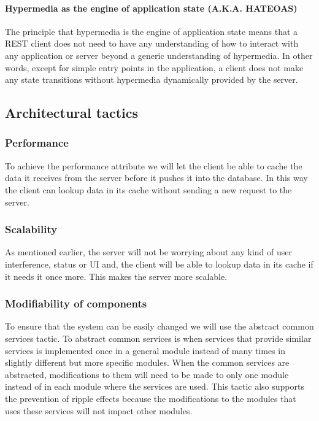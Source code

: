 \documentclass[../document.tex]{subfiles}
\begin{document}
\paragraph{Hypermedia as the engine of application state (A.K.A. HATEOAS)}
The principle that hypermedia is the engine of application state means that a REST client does not need to have any understanding of how to interact with any application or server beyond a generic understanding of hypermedia. In other words, except for simple entry points in the application, a client does not make any state transitions without hypermedia dynamically provided by the server. 

\subsection{Architectural tactics}
\subsubsection{Performance}
To achieve the performance attribute we will let the client be able to cache the data it receives from the server before it pushes it into the database. In this way the client can lookup data in its cache without sending a new request to the server.

\subsubsection{Scalability}
As mentioned earlier, the server will not be worrying about any kind of user interference, status or UI and, the client will be able to lookup data in its cache if it needs it once more. This makes the server more scalable.

\subsubsection{Modifiability of components}
To ensure that the system can be easily changed we will use the abstract common services tactic. To abstract common services is when services that provide similar services is implemented once in a general module instead of many times in slightly different but more specific modules. When the common services are abstracted, modifications to them will need to be made to only one module instead of in each module where the services are used. This tactic also supports the prevention of ripple effects because the modifications to the modules that uses these services will not impact other modules.
\end{document}
